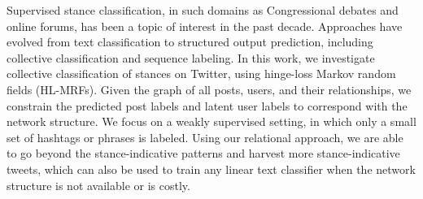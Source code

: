 Supervised stance classification, in such domains as Congressional debates and online forums, has been a topic of interest in the past decade. Approaches have evolved from text classification to structured output prediction, including collective classification and sequence labeling. In this work, we investigate collective classification of stances on Twitter, using hinge-loss Markov random fields (HL-MRFs). Given the graph of all posts, users, and their relationships, we constrain the predicted post labels and latent user labels to correspond with the network structure. We focus on a weakly supervised setting, in which only a small set of hashtags or phrases is labeled. Using our relational approach, we are able to go beyond the stance-indicative patterns and harvest more stance-indicative tweets, which can also be used to train any linear text classifier when the network structure is not available or is costly.
